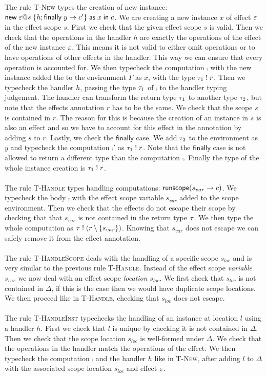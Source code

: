 {The rule \textsc{T-New} types the creation of new instance: $\mathsf{new} \; \varepsilon @ s \; \{ h; \mathsf{finally} \; y \rightarrow c' \} \; \mathsf{as} \; x \;\mathsf{in}\; c$.
We are creating a new instance $x$ of effect $\varepsilon$ in the effect scope $s$.
First we check that the given effect scope $s$ is valid.
Then we check that the operations in the handler $h$ are exactly the operations of the effect of the new instance $\varepsilon$.
This means it is not valid to either omit operations or to have operations of other effects in the handler.
This way we can ensure that every operation is accounted for.
We then typecheck the computation $\comp$ with the new instance added the to the environment $\Gamma$ as $x$, with the type $\tau_1 \; ! \; r$.
Then we typecheck the handler $h$, passing the type $\tau_1$ of $\comp$ to the handler typing judgement.
The handler can transform the return type $\tau_1$ to another type $\tau_2$, but note that the effects annotation $r$ has to be the same.
We check that the scope $s$ is contained in $r$.
The reason for this is because the creation of an instance in $s$ is also an effect and so we have to account for this effect in the annotation by adding $s$ to $r$.
Lastly, we check the $\mathsf{finally}$ case.
We add $\tau_2$ to the environment as $y$ and typecheck the computation $\comp'$ as $\tau_1 \; ! \; r$.
Note that the $\mathsf{finally}$ case is not allowed to return a different type than the computation $\comp$.
Finally the type of the whole instance creation is $\tau_1 \; ! \; r$.
\\\\
The rule \textsc{T-Handle} types handling computations: $\mathsf{runscope} ( s_{var} \rightarrow c )$.
We typecheck the body $\comp$ with the effect scope variable $s_{var}$ added to the scope environment.
Then we check that the effects do not escape their scope by checking that that $s_{var}$ is not contained in the return type $\tau$.
We then type the whole computation as $\tau \; ! \; (r \setminus \{ s_{var} \})$.
Knowing that $s_{var}$ does not escape we can safely remove it from the effect annotation.
\\\\
The rule \textsc{T-HandleScope} deals with the handling of a specific scope $s_{loc}$ and is very similar to the previous rule \textsc{T-Handle}.
Instead of the effect scope \emph{variable} $s_{var}$ we now deal with an effect scope \emph{location} $s_{loc}$.
We first check that $s_{loc}$ is not contained in $\Delta$, if this is the case then we would have duplicate scope locations.
We then proceed like in \textsc{T-Handle}, checking that $s_{loc}$ does not escape.
\\\\
The rule \textsc{T-HandleInst} typechecks the handling of an instance at location $l$ using a handler $h$.
First we check that $l$ is unique by checking it is not contained in $\Delta$.
Then we check that the scope location $s_{loc}$ is well-formed under $\Delta$.
We check that the operations in the handler match the operations of the effect.
We then typecheck the computation $\comp$ and the handler $h$ like in \textsc{T-New}, after adding $l$ to $\Delta$ with the associated scope location $s_{loc}$ and effect $\varepsilon$.

}
